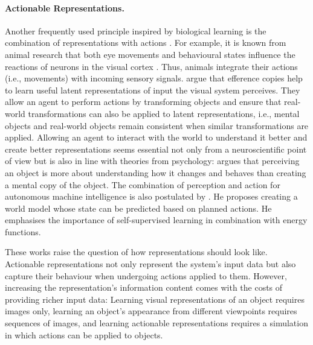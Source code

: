 \paragraph{Actionable Representations.} Another frequently used principle inspired by biological learning is the combination of representations with actions \cite{knoblich_social_2006, zhou_does_2019}. For example, it is known from animal research that both eye movements and behavioural states influence the reactions of neurons in the visual cortex .
Thus, animals integrate their actions (i.e., movements) with incoming sensory signals.
 argue that efference copies help to learn useful latent representations of input the visual system perceives. They allow an agent to perform actions by transforming objects and ensure that real-world transformations can also be applied to latent representations, i.e., mental objects and real-world objects remain consistent when similar transformations are applied.
Allowing an agent to interact with the world to understand it better and create better representations seems essential not only from a neuroscientific point of view but is also in line with theories from psychology:
 argues that perceiving an object is more about understanding how it changes and behaves than creating a mental copy of the object.
The combination of perception and action for autonomous machine intelligence is also postulated by . He proposes creating a world model whose state can be predicted based on planned actions. He emphasises the importance of self-supervised learning in combination with energy functions.

These works raise the question of how representations should look like. Actionable representations not only represent the system's input data but also capture their behaviour when undergoing actions applied to them. However, increasing the representation's information content comes with the costs of providing richer input data: Learning visual representations of an object requires images only, learning an object's appearance from different viewpoints requires sequences of images, and learning actionable representations requires a simulation in which actions can be applied to objects. 

